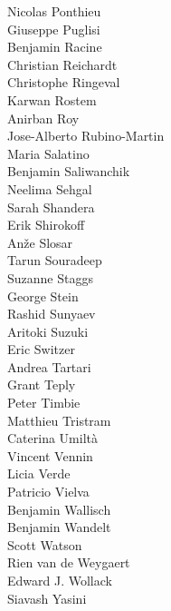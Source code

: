 \documentclass[PICOReport.tex]{subfiles}
\begin{document}
{\begin{multicols}{4}
Nicolas Ponthieu                \\
Giuseppe Puglisi                \\
Benjamin Racine                 \\
Christian Reichardt             \\
Christophe Ringeval             \\
Karwan Rostem                   \\
Anirban Roy                     \\
Jose-Alberto Rubino-Martin      \\
Maria Salatino                  \\
Benjamin Saliwanchik            \\
Neelima Sehgal                  \\
Sarah Shandera                  \\
Erik Shirokoff                  \\
An\v{z}e Slosar                 \\
Tarun Souradeep                 \\
Suzanne Staggs                  \\
George Stein                    \\
Rashid Sunyaev                  \\
Aritoki Suzuki                  \\
Eric Switzer                    \\
Andrea Tartari                  \\
Grant Teply                     \\
Peter Timbie                    \\
Matthieu Tristram               \\
Caterina Umilt\`{a}             \\
Vincent Vennin                  \\
Licia Verde                     \\
Patricio Vielva                 \\
Benjamin Wallisch               \\
Benjamin Wandelt                \\
Scott Watson                    \\
Rien van de Weygaert            \\
Edward J. Wollack               \\
Siavash Yasini
\end{multicols}
}
\end{document}
